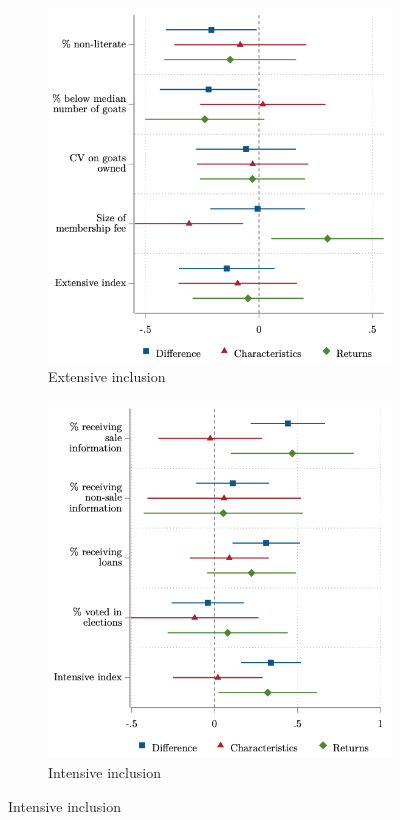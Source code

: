 \documentclass[11pt]{article}
\begin{document}
\vspace{.5cm}
\begin{figure}[H] 
\caption{Decomposition results for the cooperative benefits index} \label{figure:decomp_4}
    \centering
    \begin{subfigure}[t]{.48\textwidth}
    \centering
        \caption{Extensive inclusion} \label{figure:decomp_4_ex}
        \includegraphics[width=\linewidth,trim=4 4 4 4,clip]{decomp_4_ex.png} 
    \end{subfigure}
    \vspace{.1cm}
    \begin{subfigure}[t]{0.475\textwidth}
        \centering
        \caption{Intensive inclusion} \label{figure:decomp_4_in}
        \includegraphics[width=\linewidth,trim=4 4 4 4,clip]{decomp_4_in.png} 

\end{subfigure}
\end{figure}
\end{document}
